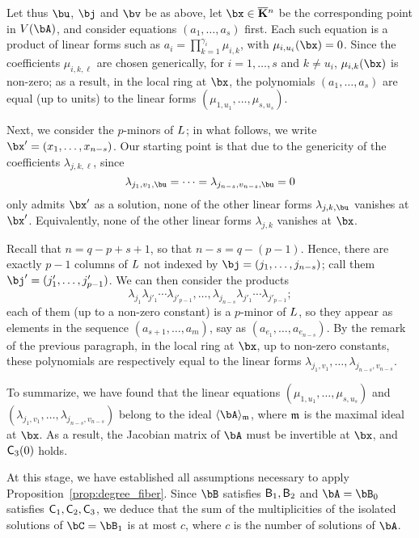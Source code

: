 \documentclass[12pt]{article}
\begin{document}
Let thus $\bu$, $\bj$ and $\bv$ be as above, let $\bx \in \KKbar{}^n$
be the corresponding point in $V(\bA)$, and consider equations
$(a_1,\dots,a_s)$ first. Each such equation is a product of linear forms
such as $a_i=\prod_{k=1}^{\gamma_i} \mu_{i,k}$, with $\mu_{i,u_i}(\bx)=0$.
Since the coefficients $\mu_{i,k,\ell}$ are chosen generically, for
$i=1,\dots,s$ and $k \ne u_i$, $\mu_{i,k}(\bx)$ is non-zero; as a
result, in the local ring at $\bx$, the polynomials $(a_1,\dots,a_s)$
are equal (up to units) to the linear forms
$(\mu_{1,u_1},\dots,\mu_{s,u_s})$.

Next, we consider the $p$-minors of ${L}$; in what follows, we 
write $\bx'=(x_1,\dots,x_{n-s})$. Our starting point is that due to 
the genericity of the coefficients $\lambda_{j,k,\ell}$, since 
$$\lambda_{j_1,v_1,\bu}=\cdots=\lambda_{j_{n-s},v_{n-s},\bu}=0$$
only admits $\bx'$ as a solution,
none of the other linear forms $\lambda_{j,k,\bu}$ vanishes at $\bx'$.
Equivalently, none of the other linear forms $\lambda_{j,k}$ vanishes at $\bx$.

Recall that $n=q-p+s+1$, so that $n-s = q-(p-1)$. Hence, there are
exactly $p-1$ columns of ${L}$ not indexed by $\bj=(j_1,\dots,j_{n-s})$; call
them $\bj'=(j'_1,\dots,j'_{p-1})$. We can then consider the 
products
$$ \lambda_{j_1} \lambda_{j'_1} \cdots \lambda_{j'_{p-1}},\dots, \lambda_{j_{n-s}}
\lambda_{j'_1} \cdots \lambda_{j'_{p-1}};$$ each of them (up to a non-zero
constant) is a $p$-minor of ${L}$, so they appear as elements in the
sequence $(a_{s+1},\dots,a_m)$, say as
$(a_{e_1},\dots,a_{e_{n-s}})$. By the remark of the previous
paragraph, in the local ring at $\bx$, up to non-zero constants, these
polynomials are respectively equal to the linear forms
$\lambda_{j_1,v_1},\dots,\lambda_{j_{n-s},v_{n-s}}$.  

To summarize, we have found that the linear equations
$(\mu_{1,u_1},\dots,\mu_{s,u_s})$ and
$(\lambda_{j_1,v_1},\dots,\lambda_{j_{n-s},v_{n-s}})$ belong to the
ideal $\langle \bA \rangle_\m$, where $\mathfrak{m}$ is the maximal ideal at
$\bx$. As a result, the Jacobian matrix of $\bA$ must be invertible
at $\bx$, and $\mathsf{C}_3(0)$ holds.


\medskip

At this stage, we have established all assumptions necessary to apply
Proposition~\ref{prop:degree_fiber}. Since $\bB$ satisfies
$\mathsf{B}_1,\mathsf{B}_2$ and $\bA=\bB_0$ satisfies $\mathsf{C}_1,\mathsf{C}_2,\mathsf{C}_3$,
we deduce that the sum of the multiplicities of the isolated solutions
of $\bC=\bB_1$ is at most $c$, where $c$ is the number of solutions of
$\bA$. 
\end{document}
